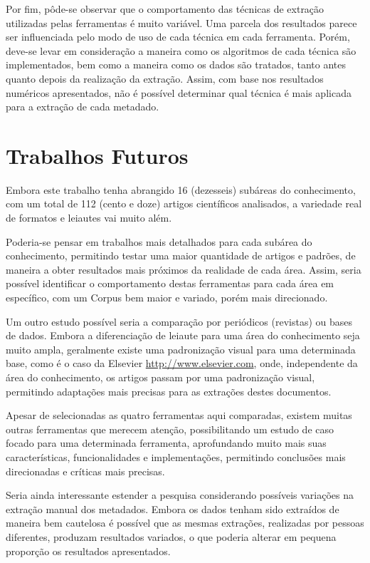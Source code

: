 Por fim, pôde-se observar que o comportamento das técnicas de extração utilizadas pelas ferramentas é muito variável. Uma parcela dos resultados parece ser influenciada pelo modo de uso de cada técnica em cada ferramenta. Porém, deve-se levar em consideração a maneira como os algoritmos de cada técnica são implementados, bem como a maneira como os dados são tratados, tanto antes quanto depois da realização da extração. Assim, com base nos resultados numéricos apresentados, não é possível determinar qual técnica é mais aplicada para a extração de cada metadado.

\section{Trabalhos Futuros}
\label{sec:future-work}

Embora este trabalho tenha abrangido 16 (dezesseis) subáreas do conhecimento, com um total de 112 (cento e doze) artigos científicos analisados, a variedade real de formatos e leiautes vai muito além.

Poderia-se pensar em trabalhos mais detalhados para cada subárea do conhecimento, permitindo testar uma maior quantidade de artigos e padrões, de maneira a obter resultados mais próximos da realidade de cada área. Assim, seria possível identificar o comportamento destas ferramentas para cada área em específico, com um Corpus bem maior e variado, porém mais direcionado.

Um outro estudo possível seria a comparação por periódicos (revistas) ou bases de dados. Embora a diferenciação de leiaute para uma área do conhecimento seja muito ampla, geralmente existe uma padronização visual para uma determinada base, como é o caso da Elsevier \url{http://www.elsevier.com}, onde, independente da área do conhecimento, os artigos passam por uma padronização visual, permitindo adaptações mais precisas para as extrações destes documentos. 

Apesar de selecionadas as quatro ferramentas aqui comparadas, existem muitas outras ferramentas que merecem atenção, possibilitando um estudo de caso focado para uma determinada ferramenta, aprofundando muito mais suas características, funcionalidades e implementações, permitindo conclusões mais direcionadas e críticas mais precisas.

Seria ainda interessante estender a pesquisa considerando possíveis variações na extração manual dos metadados. Embora os dados tenham sido extraídos de maneira bem cautelosa é possível que as mesmas extrações, realizadas por pessoas diferentes, produzam resultados variados, o que poderia alterar em pequena proporção os resultados apresentados.

